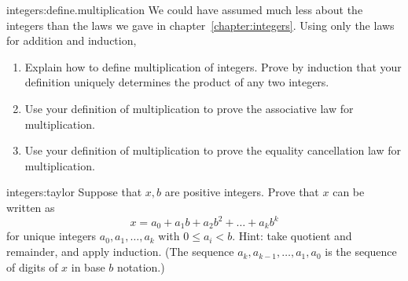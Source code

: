 \begin{problem}{integers:define.multiplication}
We could have assumed much less about the integers than the laws we gave in chapter~\ref{chapter:integers}.
Using only the laws for addition and induction,
\begin{enumerate}
\item Explain how to define multiplication of integers.
Prove by induction that your definition uniquely determines the product of any two integers.
\item Use your definition of multiplication to prove the associative law for multiplication.  
\item Use your definition of multiplication to prove the equality cancellation law for multiplication. 
\end{enumerate}
\end{problem}
\begin{problem}{integers:taylor}
Suppose that \(x,b\) are positive integers.
Prove that \(x\) can be written as
\[
x = a_0 + a_1 b + a_2 b^2 + \dots + a_k b^k
\]
for unique integers \(a_0, a_1, \dots, a_k\) with \(0 \le a_i < b\).
Hint: take quotient and remainder, and apply induction.
(The sequence \(a_k,a_{k-1},\dots,a_1,a_0\) is the sequence of digits of \(x\) in base \(b\) notation.)
\end{problem}

